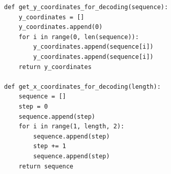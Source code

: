 \documentclass[a4paper14pt]{article}
\begin{document}
\begin{lstlisting}
def get_y_coordinates_for_decoding(sequence):
    y_coordinates = []
    y_coordinates.append(0)
    for i in range(0, len(sequence)):
        y_coordinates.append(sequence[i])
        y_coordinates.append(sequence[i])
    return y_coordinates

def get_x_coordinates_for_decoding(length):
    sequence = []
    step = 0
    sequence.append(step)
    for i in range(1, length, 2):
        sequence.append(step)
        step += 1
        sequence.append(step)
    return sequence
\end{lstlisting}
\end{document}
